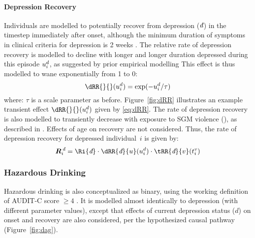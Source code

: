 \paragraph{Depression Recovery}
Individuals are modelled to potentially recover from depression ($\d$)
in the timestep immediately after onset,
although the minimum duration of symptoms
in clinical criteria for depression is 2 weeks \cite{APA2013}.
The relative rate of depression recovery is modelled to decline
with longer and longer duration depressed during this episode $u^d_i$,
as suggested by prior empirical modelling \cite{Patten2005}
This effect is thus modelled to wane exponentially from 1 to 0:
\begin{equation}\label{eq:dRR}
  \dRR{}{}(\du^d_i) = \exp(-\du^d_i/\tau)
\end{equation}
where: $\tau$ is a scale parameter as before.
Figure~\ref{fig:dRR} illustrates
an example transient effect $\dRR{}{}(\du^d_i)$ given by \eqref{eq:dRR}.
The rate of depression recovery is also modelled to
transiently decrease with exposure to SGM violence (),
as described in .
Effects of age on recovery are not considered.
Thus, the rate of depression recovery for depressed individual~$i$ is given by:
\begin{equation}
  \Gi{\d} = \Ri{\d}
    \cdot \dRR{\d}{\du}(\du^d_i)
    \cdot \tRR{\d}{v}(t^v_i)
\end{equation}
\subsubsection{Hazardous Drinking}\label{mod.par.evt.haz}
Hazardous drinking is also conceptualized as binary,
using the working definition of AUDIT-C score $\ge 4$ \cite{Bush1998}.
It is modelled almost identically to depression
(with different parameter values),
except that effects of current depression status ($d$)
on \hazdrink onset and recovery are also considered,
per the hypothesized causal pathway (Figure~\ref{fig:dag}).
